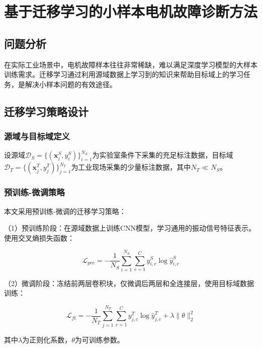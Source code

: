 \chapter{基于迁移学习的小样本电机故障诊断方法}

\section{问题分析}

在实际工业场景中，电机故障样本往往非常稀缺，难以满足深度学习模型的大样本训练需求。迁移学习通过利用源域数据上学习到的知识来帮助目标域上的学习任务，是解决小样本问题的有效途径。

\section{迁移学习策略设计}

\subsection{源域与目标域定义}

设源域$\mathcal{D}_S = \{(\mathbf{x}_i^S, y_i^S)\}_{i=1}^{N_S}$为实验室条件下采集的充足标注数据，目标域$\mathcal{D}_T = \{(\mathbf{x}_j^T, y_j^T)\}_{j=1}^{N_T}$为工业现场采集的少量标注数据，其中$N_T \ll N_S$。

\subsection{预训练-微调策略}

本文采用预训练-微调的迁移学习策略：

（1）预训练阶段：在源域数据上训练CNN模型，学习通用的振动信号特征表示。使用交叉熵损失函数：

\begin{equation}
	\mathcal{L}_{pre} = -\frac{1}{N_S}\sum_{i=1}^{N_S}\sum_{c=1}^{C} y_{i,c}^S \log \hat{y}_{i,c}^S
	\label{eq:pretrain_loss}
\end{equation}

（2）微调阶段：冻结前两层卷积块，仅微调后两层和全连接层，使用目标域数据训练：

\begin{equation}
	\mathcal{L}_{ft} = -\frac{1}{N_T}\sum_{j=1}^{N_T}\sum_{c=1}^{C} y_{j,c}^T \log \hat{y}_{j,c}^T + \lambda \|\theta\|_2^2
	\label{eq:finetune_loss}
\end{equation}

其中$\lambda$为正则化系数，$\theta$为可训练参数。

